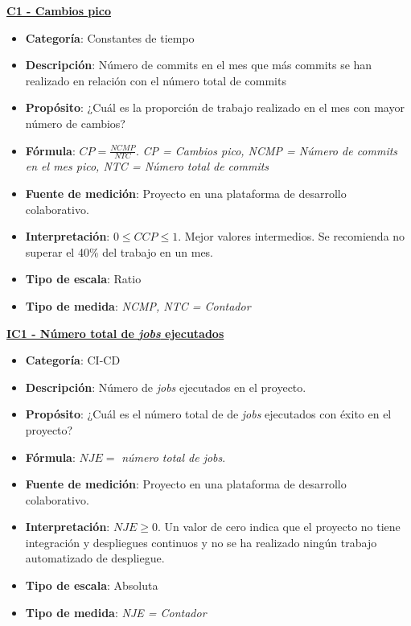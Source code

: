 \textbf{\underline{C1 - Cambios pico}}

\begin{itemize}
	\item \textbf{Categoría}: Constantes de tiempo
	\item \textbf{Descripción}: Número de commits en el mes que más commits se han realizado en relación con el número total de commits
	\item \textbf{Propósito}: ¿Cuál es la proporción de trabajo realizado en el mes con mayor número de cambios?
	\item \textbf{Fórmula}: $CP = \frac{NCMP}{NTC}$. \textit{CP = Cambios pico, NCMP = Número de commits en el mes pico, NTC = Número total de commits}
	\item \textbf{Fuente de medición}: Proyecto en una plataforma de desarrollo colaborativo.
	\item \textbf{Interpretación}: $0 \leq CCP \leq 1$. Mejor valores intermedios. Se recomienda no superar el 40\% del trabajo en un mes.
	\item \textbf{Tipo de escala}: Ratio
	\item \textbf{Tipo de medida}: \textit{NCMP, NTC = Contador}
\end{itemize}

\textbf{\underline{IC1 - Número total de \textit{jobs} ejecutados}}
\begin{itemize}
	\item \textbf{Categoría}: CI-CD
	\item \textbf{Descripción}: Número de \textit{jobs} ejecutados en el proyecto.
	\item \textbf{Propósito}: ¿Cuál es el número total de de \textit{jobs} ejecutados con éxito en el proyecto?
	\item \textbf{Fórmula}: $NJE =$ \textit{número total de jobs}.
	\item \textbf{Fuente de medición}: Proyecto en una plataforma de desarrollo colaborativo.
	\item \textbf{Interpretación}: $NJE \geq 0$. Un valor de cero indica que el proyecto no tiene integración y despliegues continuos y no se ha realizado ningún trabajo automatizado de despliegue.
	\item \textbf{Tipo de escala}: Absoluta
	\item \textbf{Tipo de medida}: \textit{NJE = Contador}
\end{itemize}

